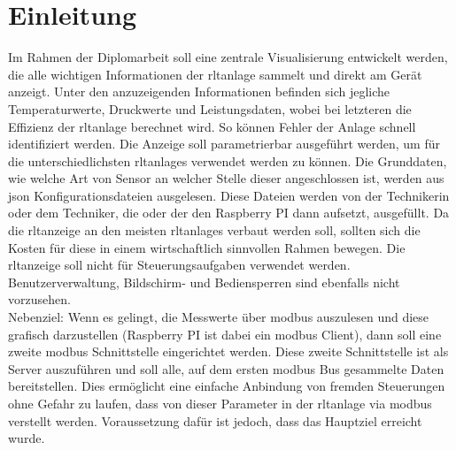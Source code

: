 \chapter{Einleitung} 
\label{aufgabenstellung}
\noindent Im Rahmen der Diplomarbeit soll eine zentrale Visualisierung entwickelt werden, die alle wichtigen Informationen der \ac{rltanlage} sammelt und direkt am Gerät anzeigt. Unter den anzuzeigenden Informationen befinden sich jegliche Temperaturwerte, Druckwerte und Leistungsdaten, wobei bei letzteren die Effizienz der \ac{rltanlage} berechnet wird. So können Fehler der Anlage schnell identifiziert werden.
Die Anzeige soll parametrierbar ausgeführt werden, um für die unterschiedlichsten 
\acp{rltanlage} verwendet werden zu können. Die Grunddaten, wie \zB welche Art von 
Sensor \bzw an welcher Stelle dieser angeschlossen ist, werden aus \ac{json} Konfigurationsdateien ausgelesen. Diese Dateien werden von der Technikerin oder dem Techniker, die oder der den Raspberry PI dann aufsetzt, ausgefüllt.
Da die \ac{rltanzeige} an den meisten \acp{rltanlage} verbaut werden soll, sollten sich die Kosten für diese in einem wirtschaftlich sinnvollen Rahmen bewegen.
Die \ac{rltanzeige} soll nicht für Steuerungsaufgaben verwendet werden. Benutzerverwaltung, 
Bildschirm- und Bediensperren sind ebenfalls nicht vorzusehen. \\

Nebenziel:
Wenn es gelingt, die Messwerte über \gls{modbus} auszulesen und diese grafisch darzustellen (Raspberry PI ist dabei ein \gls{modbus} Client), dann soll eine zweite \gls{modbus} Schnittstelle eingerichtet werden. Diese zweite Schnittstelle ist als Server auszuführen und soll alle, auf dem ersten \gls{modbus} Bus gesammelte Daten bereitstellen. Dies ermöglicht eine einfache Anbindung von fremden Steuerungen ohne Gefahr zu laufen, dass von dieser Parameter in der \ac{rltanlage} via \gls{modbus} verstellt werden. Voraussetzung dafür ist jedoch, dass das Hauptziel erreicht wurde.

